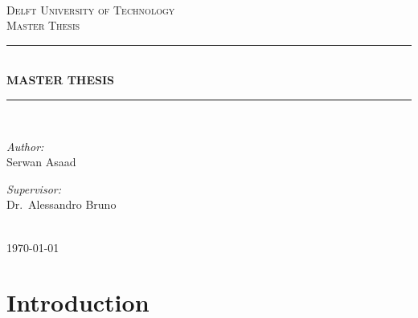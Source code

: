 \documentclass[12pt]{report}
\newcommand{\HRule}[1]{\rule{\linewidth}{#1}}
\begin{document}
\begin{titlepage}
\begin{center}
~\\ [4.0cm]
\textsc{\LARGE Delft University of Technology}
\\ [3.0cm]
\textsc{\Large Master Thesis}
\HRule{0.5pt} \\
\LARGE \textbf{\uppercase{Master thesis}}
\HRule{2pt} \\ [0.5cm]

\noindent
\begin{minipage}{0.4\textwidth}
\begin{flushleft} \large
\emph{Author:}\\
Serwan Asaad
\end{flushleft}
\end{minipage}%
\begin{minipage}{0.4\textwidth}
\begin{flushright} \large
\emph{Supervisor:} \\
Dr.~Alessandro Bruno
\end{flushright}
\end{minipage}
\\ [3.0cm]
{\large \today}
\end{center}

\end{titlepage}


\author{
        Serwan Asaad
        Student ID: 4323475 \\
        Delft University of Technology \\
        Kavli Institute of Nanoschience\\
        Quantum Nanoscience Department\\
        Quantum Transport Group\\
        DiCarlo Lab}

\tableofcontents
\newpage

\sectionfont{\scshape}


\section*{Introduction}
\end{document}
